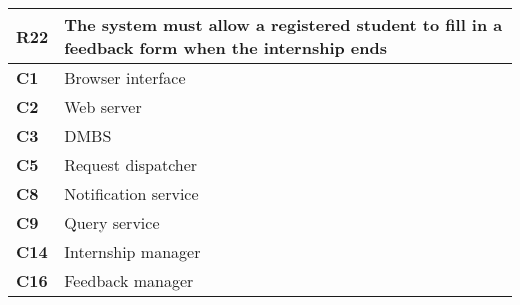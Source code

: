 \begin{table}[H]
    \centering
    \begin{tabular}{|l|m{10cm}|}
        \hline \textbf{R22} & The system must allow a registered student to fill in a feedback form when the internship ends \\
        \hline \textbf{C1} & Browser interface \\
        \hline \textbf{C2} & Web server \\
        \hline \textbf{C3} & DMBS \\
        \hline \textbf{C5} & Request dispatcher \\
        \hline \textbf{C8} & Notification service \\
        \hline \textbf{C9} & Query service \\
        \hline \textbf{C14} & Internship manager \\
        \hline \textbf{C16} & Feedback manager \\
        \hline
    \end{tabular}
\end{table}

